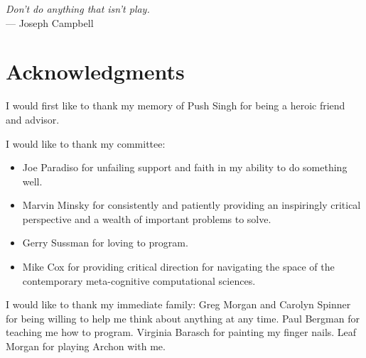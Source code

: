 



\begin{flushright}{\slshape    
Don't do anything that isn't play.} \\ \medskip
    --- Joseph Campbell
\end{flushright}



\bigskip

\begingroup
\let\clearpage\relax
\let\cleardoublepage\relax
\let\cleardoublepage\relax
\chapter*{Acknowledgments}

I would first like to thank my memory of Push Singh for being a heroic friend and advisor.

\vspace{5mm}

\noindent I would like to thank my committee:
\begin{itemize}
\item{Joe Paradiso for unfailing support and faith in my ability to do
  something well.}
\item{Marvin Minsky for consistently and patiently providing an
  inspiringly critical perspective and a wealth of important problems
  to solve.}
\item{Gerry Sussman for loving to program.}
\item{Mike Cox for providing critical direction for navigating the
  space of the contemporary meta-cognitive computational sciences.}
\end{itemize}

\vspace{5mm}

\noindent I would like to thank my immediate family:
Greg Morgan and Carolyn Spinner for being willing to help me think about anything at any time.
Paul Bergman for teaching me how to program.
Virginia Barasch for painting my finger nails.
Leaf Morgan for playing Archon with me.

\vspace{5mm}

